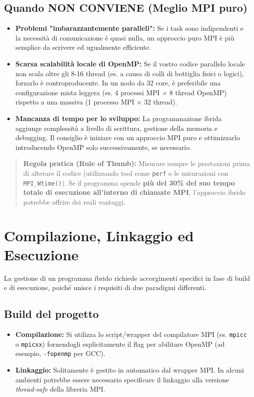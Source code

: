 \subsection*{Quando NON CONVIENE (Meglio MPI puro)}
\begin{itemize}
    \item \textbf{Problemi "imbarazzantemente paralleli":} Se i task sono indipendenti e la necessità di comunicazione è quasi nulla, un approccio puro MPI è più semplice da scrivere ed ugualmente efficiente.
    \item \textbf{Scarsa scalabilità locale di OpenMP:} Se il vostro codice parallelo locale non scala oltre gli 8-16 thread (es. a causa di colli di bottiglia fisici o logici), forzarlo è controproducente. In un nodo da 32 core, è preferibile una configurazione mista leggera (es. 4 processi MPI $\times$ 8 thread OpenMP) rispetto a una massiva (1 processo MPI $\times$ 32 thread).
    \item \textbf{Mancanza di tempo per lo sviluppo:} La programmazione ibrida aggiunge complessità a livello di scrittura, gestione della memoria e debugging. Il consiglio è iniziare con un approccio MPI puro e ottimizzarlo introducendo OpenMP solo successivamente, se necessario.
\end{itemize}

\vspace{0.5cm}
\begin{quote}
    \textbf{Regola pratica (Rule of Thumb):}
    Misurare sempre le prestazioni prima di alterare il codice (utilizzando tool come \texttt{perf} o le misurazioni con \texttt{MPI\_Wtime()}). Se il programma spende \textbf{più del 30\% del suo tempo totale di esecuzione all'interno di chiamate MPI}, l'approccio ibrido potrebbe offrire dei reali vantaggi.
\end{quote}

\section*{Compilazione, Linkaggio ed Esecuzione}

La gestione di un programma ibrido richiede accorgimenti specifici in fase di build e di esecuzione, poiché unisce i requisiti di due paradigmi differenti.

\subsection*{Build del progetto}
\begin{itemize}
    \item \textbf{Compilazione:} Si utilizza lo script/wrapper del compilatore MPI (es. \texttt{mpicc} o \texttt{mpicxx}) fornendogli esplicitamente il flag per abilitare OpenMP (ad esempio, \texttt{-fopenmp} per GCC).
    \item \textbf{Linkaggio:} Solitamente è gestito in automatico dal wrapper MPI. In alcuni ambienti potrebbe essere necessario specificare il linkaggio alla versione \textit{thread-safe} della libreria MPI.
\end{itemize}

